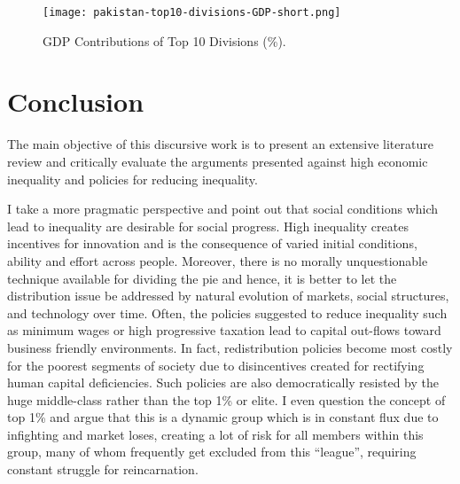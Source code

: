 \documentclass[12pt]{article}
\newcommand{\1}{\mathbbm 1}
\begin{document}
		 
		
		
		
		
		
		
		
		
		
		
		
		
		
	
		
	\begin{figure}[H] 
			\texttt{[image: pakistan-top10-divisions-GDP-short.png]}%
		\caption{GDP Contributions of Top 10 Divisions (\%).}
	\end{figure}
		
		
		
		
		
		
		
		
		
		
		
		
		
		
		
		
		
	
			
			
			
	
	 
		
		
	
		\section{Conclusion}
		
		
		The main objective of this discursive work is to present an extensive literature review and critically evaluate the arguments presented against high economic inequality and policies for reducing inequality.
		
		 I take a more pragmatic perspective and point out that social conditions which lead to inequality are desirable for social progress. High inequality creates incentives for innovation and is the consequence of varied initial conditions, ability and effort across people. Moreover, there is no morally unquestionable technique available for dividing the pie and hence, it is better to let the distribution issue be addressed by natural evolution of markets, social structures, and technology over time. Often, the policies suggested to reduce inequality such as minimum wages or high progressive taxation lead to capital out-flows toward business friendly environments. In fact, redistribution policies become most costly for the poorest segments of society due to disincentives created for rectifying human capital deficiencies. Such policies are also democratically resisted by the huge middle-class rather than the top 1\% or elite. I even question the concept of top 1\% and argue that this is a dynamic group which is in constant flux due to infighting and market loses, creating a lot of risk for all members within this group, many of whom frequently get excluded from this ``league'', requiring constant struggle for reincarnation.
		
\end{document}

